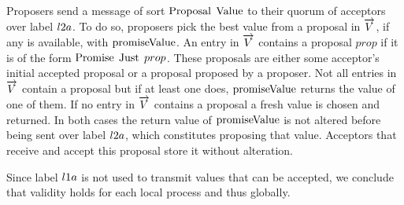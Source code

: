 Proposers send a message of sort $\operatorname{Proposal}\; \operatorname{Value}$ to their quorum of acceptors over label $l2a$.
To do so, proposers pick the best value from a proposal in $\overrightarrow{V}$, if any is available, with $\operatorname{promiseValue}$.
An entry in $\overrightarrow{V}$ contains a proposal $prop$ if it is of the form $\operatorname{Promise}\; \operatorname{Just}\; prop$.
These proposals are either some acceptor's initial accepted proposal or a proposal proposed by a proposer.
Not all entries in $\overrightarrow{V}$ contain a proposal but if at least one does, $\operatorname{promiseValue}$ returns the value of one of them.
If no entry in $\overrightarrow{V}$ contains a proposal a fresh value is chosen and returned.
In both cases the return value of $\operatorname{promiseValue}$ is not altered before being sent over label $l2a$, which constitutes proposing that value.
Acceptors that receive and accept this proposal store it without alteration.

Since label $l1a$ is not used to transmit values that can be accepted, we conclude that validity holds for each local process and thus globally.
